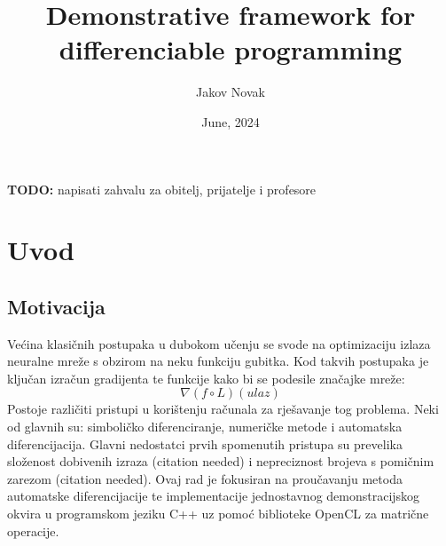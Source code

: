 \documentclass[zavrsnirad]{fer}
\title{Demonstrative framework for differenciable programming}
\author{Jakov Novak}
\date{June, 2024}
\begin{document}
\maketitle






\begin{zahvale}
  \textbf{TODO:} napisati zahvalu za obitelj, prijatelje i profesore
\end{zahvale}


\mainmatter


\tableofcontents


\chapter{Uvod}
\label{pog:uvod}

\section{Motivacija}
Većina klasičnih postupaka u dubokom učenju se svode na optimizaciju izlaza neuralne mreže s obzirom na neku funkciju gubitka. Kod takvih postupaka je ključan izračun gradijenta te funkcije kako bi se podesile značajke mreže:
\begin{equation}
  \nabla (f \circ L) (ulaz)
\end{equation}
Postoje različiti pristupi u korištenju računala za rješavanje tog problema. Neki od glavnih su: simboličko diferenciranje, numeričke metode i automatska diferencijacija. Glavni nedostatci prvih spomenutih pristupa su prevelika složenost dobivenih izraza (citation needed) i nepreciznost brojeva s pomičnim zarezom (citation needed). Ovaj rad je fokusiran na proučavanju metoda automatske diferencijacije te implementacije jednostavnog demonstracijskog okvira u programskom jeziku C++ uz pomoć biblioteke OpenCL za matrične operacije.
\end{document}

